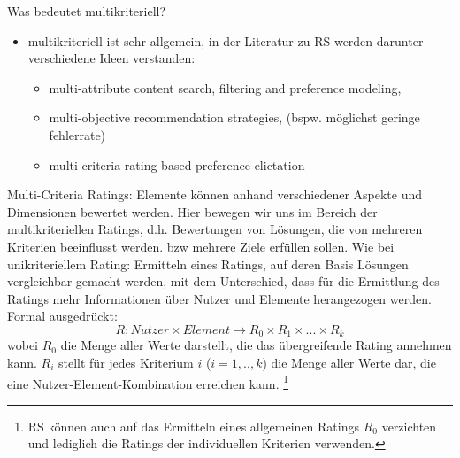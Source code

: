 Was bedeutet multikriteriell?
\begin{itemize}
    \item multikriteriell ist sehr allgemein, in der Literatur zu RS werden darunter verschiedene Ideen verstanden: %
    \begin{itemize}
        \item multi-attribute content search, filtering and preference modeling,
        \item multi-objective recommendation strategies, (bspw. möglichst geringe fehlerrate)
        \item multi-criteria rating-based preference elictation
    \end{itemize}
\end{itemize}

Multi-Criteria Ratings: Elemente können anhand verschiedener Aspekte und Dimensionen bewertet werden. %
Hier bewegen wir uns im Bereich der multikriteriellen Ratings, d.h. Bewertungen von Lösungen, die von mehreren Kriterien beeinflusst werden. bzw mehrere Ziele erfüllen sollen.
Wie bei unikriteriellem Rating: Ermitteln eines Ratings, auf deren Basis Lösungen vergleichbar gemacht werden, mit dem Unterschied, dass für die Ermittlung des Ratings mehr Informationen über Nutzer und Elemente herangezogen werden. %
Formal ausgedrückt: %
\begin{equation}
    R: Nutzer \times Element \rightarrow R_{0} \times R_{1} \times ... \times R_{k}
\end{equation}
wobei $R_{0}$ die Menge aller Werte darstellt, die das übergreifende Rating annehmen kann.
$R_{i}$ stellt für jedes Kriterium $i$ ($i = 1, .., k$) die Menge aller Werte dar, die eine Nutzer-Element-Kombination erreichen kann. %
\footnote{RS können auch auf das Ermitteln eines allgemeinen Ratings $R_{0}$ verzichten und lediglich die Ratings der individuellen Kriterien verwenden.}

